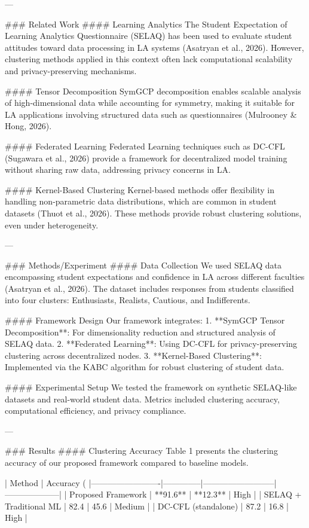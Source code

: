 ---

### Related Work
#### Learning Analytics
The Student Expectation of Learning Analytics Questionnaire (SELAQ) has been used to evaluate student attitudes toward data processing in LA systems (Asatryan et al., 2026). However, clustering methods applied in this context often lack computational scalability and privacy-preserving mechanisms.

#### Tensor Decomposition
SymGCP decomposition enables scalable analysis of high-dimensional data while accounting for symmetry, making it suitable for LA applications involving structured data such as questionnaires (Mulrooney & Hong, 2026).

#### Federated Learning
Federated Learning techniques such as DC-CFL (Sugawara et al., 2026) provide a framework for decentralized model training without sharing raw data, addressing privacy concerns in LA.

#### Kernel-Based Clustering
Kernel-based methods offer flexibility in handling non-parametric data distributions, which are common in student datasets (Thuot et al., 2026). These methods provide robust clustering solutions, even under heterogeneity.

---

### Methods/Experiment
#### Data Collection
We used SELAQ data encompassing student expectations and confidence in LA across different faculties (Asatryan et al., 2026). The dataset includes responses from students classified into four clusters: Enthusiasts, Realists, Cautious, and Indifferents.

#### Framework Design
Our framework integrates:
1. **SymGCP Tensor Decomposition**: For dimensionality reduction and structured analysis of SELAQ data.
2. **Federated Learning**: Using DC-CFL for privacy-preserving clustering across decentralized nodes.
3. **Kernel-Based Clustering**: Implemented via the KABC algorithm for robust clustering of student data.

#### Experimental Setup
We tested the framework on synthetic SELAQ-like datasets and real-world student data. Metrics included clustering accuracy, computational efficiency, and privacy compliance.

---

### Results
#### Clustering Accuracy
Table 1 presents the clustering accuracy of our proposed framework compared to baseline models.

| Method                  | Accuracy (%
|-------------------------|--------------|--------------------------|--------------------|  
| Proposed Framework      | **91.6**     | **12.3**                 | High               |  
| SELAQ + Traditional ML  | 82.4         | 45.6                     | Medium             |  
| DC-CFL (standalone)     | 87.2         | 16.8                     | High               |  

